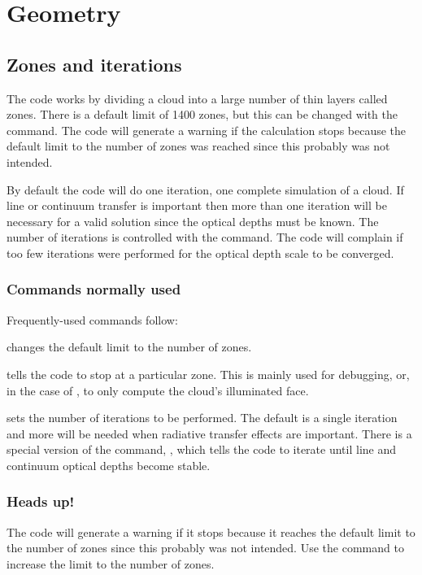 \documentclass[12pt,twoside]{article}
\begin{document}
\section{Geometry}
\label{sec:Geometry}

\subsection{Zones and iterations}

The code works by dividing a cloud into a large number of thin layers
called zones.  There is a default limit of 1400 zones, but this can be
changed with the  command.
The code will generate a warning if
the calculation stops because the default limit to the number of zones was
reached since this probably was not intended.

By default the code will do one iteration, one complete simulation of
a cloud.  If line or continuum transfer is important then more than one
iteration will be necessary for a valid solution since the optical depths
must be known.  The number of iterations is controlled with the
command.  The code will complain if too few iterations were performed for
the optical depth scale to be converged.

\subsubsection{Commands normally used}

Frequently-used commands follow:

 changes the default limit to the number of zones.

 tells the code to stop
at a particular zone.  This is mainly
used for debugging, or, in the case of , to only compute the cloud's illuminated face.

 sets the number of iterations
to be performed.  The default is
a single iteration and more will be needed when radiative transfer effects
are important.  There is a special version of the command,
,
which tells the code to iterate until line and continuum optical
depths become stable.

\subsubsection{Heads up!}

The code will generate a warning
if it stops because it reaches the
default limit to the number of zones since this probably was not intended.
Use the  command to increase
the limit to the number of zones.
\end{document}
